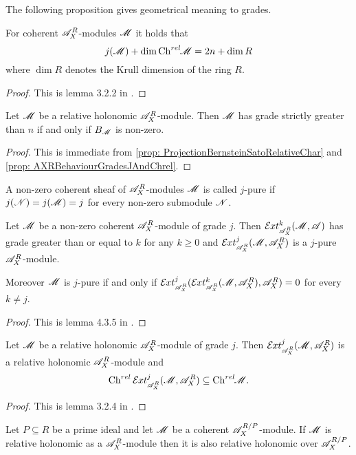 The following proposition gives geometrical meaning to grades.
\begin{proposition}\label{prop: AXRBehaviourGradesJAndChrel}
  For coherent $\mathscr{A}_X^R$-modules $\mathscr{M}$ it holds that
  $$j(\mathscr{M}) + \dim \operatorname{Ch}^{rel}\mkern-5mu \mathscr{M} = 2n + \dim R $$
  where $\dim R$ denotes the Krull dimension of the ring $R$.
\end{proposition}
\begin{proof}
  This is lemma 3.2.2 in \cite{budur2019zero}.
\end{proof}
\begin{corollary}\label{cor: GradeIFFBernsteinIdeal}
  Let $\mathscr{M}$ be a relative holonomic $\mathscr{A}_X^R$-module. Then $\mathscr{M}$ has grade strictly greater than $n$ if and only if $B_{\mathscr{M}}$ is non-zero.
\end{corollary}
\begin{proof}
  This is immediate from \cref{prop: ProjectionBernsteinSatoRelativeChar} and \cref{prop: AXRBehaviourGradesJAndChrel}.
\end{proof}
\begin{definition}
  A non-zero coherent sheaf of $\mathscr{A}_X^R$-modules $\mathscr{M}$ is called $j$-pure if $j(\mathscr{N})=j(\mathscr{M})=j$ for every non-zero submodule $\mathscr{N}$.
\end{definition}
\begin{lemma}\label{lem: ExtGrade}
  Let $\mathscr{M}$ be a non-zero coherent $\mathscr{A}_X^R$-module of grade $j$. Then $\Ex{\A_X^R}{k}(\M,\A)$ has grade greater than or equal to $k$ for any $k\geq 0$ and $\Ex{\A_X^R}{j}(\M,\A_X^R)$ is a $j$-pure $\mathscr{A}_X^R$-module.

  Moreover $\mathscr{M}$ is $j$-pure if and only if $\Ex{\A_X^R}{j}(\Ex{\A_X^R}{k}(\M,\A_X^R),\A_X^R)=0$ for every $k\neq j$.
\end{lemma}
\begin{proof}
  This is lemma 4.3.5 in \cite{budur2019zero}.
\end{proof}
\begin{lemma}
  Let $\mathscr{M}$ be a relative holonomic $\mathscr{A}_X^R$-module of grade $j$. Then $\Ex{\A_X^R}{j}(\M,\A_X^R)$ is a relative holonomic $\mathscr{A}_X^R$-module and
  $$\Ch^{rel}\Ex{\A_X^R}{j}(\M,\A_X^R)\subseteq \Chrel \M. $$
\end{lemma}
\begin{proof}
  This is lemma 3.2.4 in \cite{budur2019zero}.
\end{proof}
\begin{lemma}
  Let $P \subseteq R$ be a prime ideal and let $\mathscr{M}$ be a coherent $\mathscr{A}_X^{R/P}$-module. If $\mathscr{M}$ is relative holonomic as a $\mathscr{A}_X^R$-module then it is also relative holonomic over $\mathscr{A}_X^{R/P}$.
\end{lemma}
